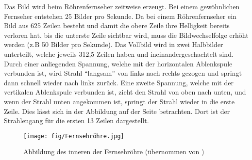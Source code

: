 Das Bild wird beim Röhrenfernseher zeitweise erzeugt.
Bei einem gewöhnlichen Fernseher entstehen 25 Bilder pro Sekunde.
Da bei einem Röhrenfernseher ein Bild aus 625 Zeilen besteht und damit die obere Zeile ihre Helligkeit bereits verloren hat, bis die unterste Zeile sichtbar wird, muss die Bildwechselfolge erhöht werden (z.B 50 Bilder pro Sekunde).
Das Vollbild wird in zwei Halbbilder unterteilt, welche jeweils 312,5 Zeilen haben und ineinandergeschachtelt sind.
Durch einer anliegenden Spannung, welche mit der horizontalen Ablenkspule verbunden ist, wird Strahl "`langsam"' von links nach rechts gezogen und springt dann schnell wieder nach links zurück.
Eine zweite Spannung, welche mit der vertikalen Ablenkspule verbunden ist, zieht den Strahl von oben nach unten, und wenn der Strahl unten angekommen ist, springt der Strahl wieder in die erste Zeile.
Dies lässt sich in der Abbildung auf der Seite \cite{Roehrenfernsehr} betrachten.
Dort ist der Strahlengang für die ersten 13 Zeilen dargestellt.
\begin{figure}
    \centering
    \texttt{[image: fig/Fernsehröhre.jpg]}
    \caption{Abbildung des inneren der Fernsehröhre (übernommen von \cite{Abbildung}) }
    \label{fig:Fernsehroehre}
\end{figure}
